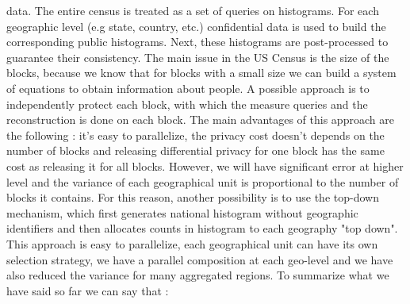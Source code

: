 data. The entire census is treated as a set of queries on histograms. For each geographic level (e.g state, country, etc.) confidential data is used to build the corresponding public histograms. Next, these histograms are post-processed to guarantee their consistency. The main issue in the US Census is the size of the blocks, because we know that for blocks with a small size we can build a system of equations to obtain information about people. A possible approach is to independently protect each block, with which the measure queries and the reconstruction is done on each block. The main advantages of this approach are the following : it's easy to parallelize, the privacy cost doesn't depends on the number of blocks and releasing differential privacy for one block has the same cost as releasing it for all blocks. However, we will have significant error at higher level and the variance of each geographical unit is proportional to the number of blocks it contains. For this reason, another possibility is to use the top-down mechanism, which first generates national histogram without geographic identifiers and then allocates counts in histogram to each geography "top down". This approach is easy to parallelize, each geographical unit can have its own selection strategy, we have a parallel composition at each geo-level and we have also reduced the variance for many aggregated regions. To summarize what we have said so far we can say that :
